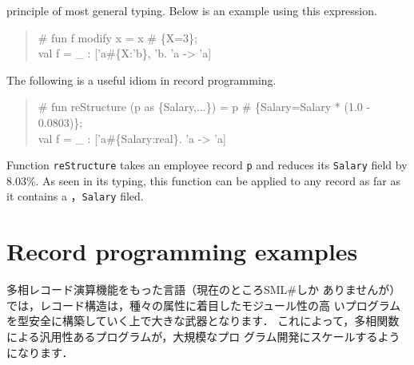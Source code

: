 \documentclass{jbook}
\newcommand{\txt}[2]{#2}
\newcommand{\smlsharp}{SML\#}
\begin{document}
principle of most general typing.
	Below is an example using this expression.
\begin{tt}\begin{quote}
\# fun f modify x = x \# \{X=3\};\\
val f = \_ : ['a\#\{X:'b\}, 'b.  'a -> 'a]
\end{quote}\end{tt}
	The following is a useful idiom in record programming.
\begin{tt}\begin{quote}
\# fun reStructure (p as \{Salary,...\}) = p \# \{Salary=Salary * (1.0 - 0.0803)\};\\
val f = \_ : ['a\#\{Salary:real\}.  'a -> 'a]
\end{quote}\end{tt}
	Function {\tt reStructure} takes an employee record {\tt p} and 
reduces its {\tt Salary} field by 8.03\%.
	As seen in its typing, this function can be applied to any
record as far as it contains a ，{\tt Salary} filed.
\fi%

\section{\txt{レコードプログラミング例}{Record programming examples}}
\label{sec:extensionRecordProgramming}

\ifx\jp%
	多相レコード演算機能をもった言語（現在のところ\smlsharp{}しか
ありませんが）では，レコード構造は，種々の属性に着目したモジュール性の高
いプログラムを型安全に構築していく上で大きな武器となります．
	これによって，多相関数による汎用性あるプログラムが，大規模なプロ
グラム開発にスケールするようになります．
\end{document}
